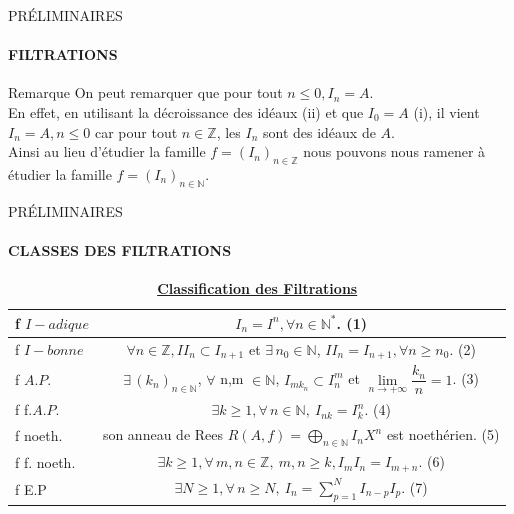\documentclass[11pt,a4paper]{beamer}
\begin{document}
		\begin{frame}{PRÉLIMINAIRES}
		\framesubtitle{FILTRATIONS}
		\begin{alertblock}{Remarque}
		On peut remarquer que pour tout $n\leq 0, I_n = A$.\\ En effet, en utilisant la décroissance des idéaux (ii) et que $I_0 = A$ (i), il vient $I_n = A, n \leq 0$ car pour tout $ n \in \mathbb{Z}$, les $I_n$ sont des idéaux de $A$.\\
		Ainsi au lieu d'étudier la famille $f = (I_n)_{n \in \mathbb{Z}}$ nous pouvons nous ramener à étudier la famille $f = (I_n)_{n \in \mathbb{N}}$.
		\end{alertblock}
	\end{frame}
		\begin{frame}{PRÉLIMINAIRES}
		\framesubtitle{CLASSES DES FILTRATIONS}
		\begin{block}{}
			\begin{table}
				\begin{center}
					\begin{tabular}{|l|c|}
						\hline
						f $I-adique$ & $I_n=I^n,\forall n \in \mathbb{N}^*$. (1)\\
						\hline
						f $I-bonne$ & $\forall n \in \mathbb{Z}, II_n \subset I_{n+1} $ et $\exists \, n_0 \in \mathbb{N}$, $II_n = I_{n+1}, \forall n \geqslant n_0.$ (2)\\
						\hline
						f $A.P.$ &$\exists \, (k_n)_{n\in \mathbb{N}} $, $\forall$ n,m $\in \mathbb{N}$, $I_{mk_n} \subset I_n^{m}$ et $\underset{n\longrightarrow +\infty }{\lim }\dfrac{k_{n}}{n}=1$. (3)\\
						\hline
						f f.$A.P.$ &$\exists k\geqslant 1, \forall \, n \in \mathbb{N}, \ I_{nk} = I_k^n$. (4)\\
						\hline
						f noeth. & son anneau de Rees ${R}(A,f)=\displaystyle \bigoplus_{n \in \mathbb{N}}{I_n X^n}$ est noethérien. (5)\\
						\hline
						f f. noeth. & $\exists k\geqslant 1, \forall \, m, n \in \mathbb{Z}, \ m, n \geqslant k, I_m I_n = I_{m+n}$. (6)\\
						\hline
						f E.P & $\exists N\geqslant 1, \forall \, n \geqslant N, \ I_n =\sum\limits_{p=1}^{N} I_{n-p}I_p.$ (7)\\
						\hline
					\end{tabular}
					
				\end{center}
				\caption{\underline{\textbf{Classification des Filtrations}}}
			\end{table}
		
		\end{block}
	\end{frame}	
	
\end{document}
